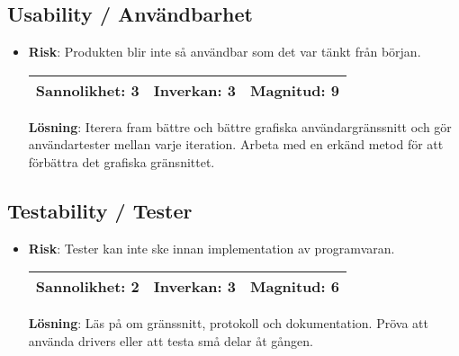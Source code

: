 \subsection{Usability / Användbarhet}
\begin{itemize}
\item \textbf{Risk}: Produkten blir inte så användbar som det var tänkt från början.

\begin{tabular}{ | l | l | l |}
	\hline
	Sannolikhet: 3 & Inverkan: 3 & Magnitud: 9 \\ \hline
\end{tabular}

\textbf{Lösning}: Iterera fram bättre och bättre grafiska användargränssnitt och gör användartester mellan varje iteration. Arbeta med en erkänd metod för att förbättra det grafiska gränsnittet.
\end{itemize}

\subsection{Testability / Tester}
\begin{itemize}
\item \textbf{Risk}: Tester kan inte ske innan implementation av programvaran.

\begin{tabular}{ | l | l | l |}
	\hline
	Sannolikhet: 2 & Inverkan: 3 & Magnitud: 6 \\ \hline
\end{tabular}

\textbf{Lösning}: Läs på om gränssnitt, protokoll och dokumentation. Pröva att använda drivers eller att testa små delar åt gången.
\end{itemize}

